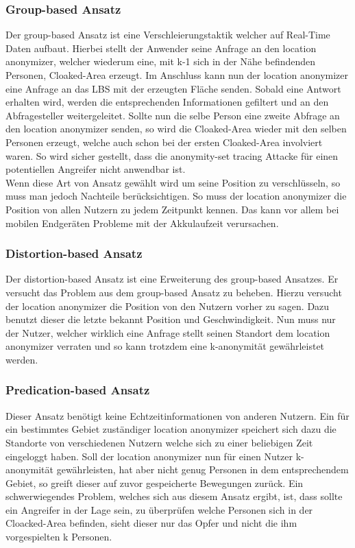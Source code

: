 \subsubsection{Group-based Ansatz}
Der group-based Ansatz ist eine Verschleierungstaktik welcher auf Real-Time Daten aufbaut. Hierbei stellt der Anwender seine Anfrage an den location anonymizer, welcher wiederum eine, mit k-1 sich in der Nähe befindenden Personen, Cloaked-Area erzeugt. Im Anschluss kann nun der location anonymizer eine Anfrage an das LBS mit der erzeugten Fläche senden. Sobald eine Antwort erhalten wird, werden die entsprechenden Informationen gefiltert und an den Abfragesteller weitergeleitet. Sollte nun die selbe Person eine zweite Abfrage an den location anonymizer senden, so wird die Cloaked-Area wieder mit den selben Personen erzeugt, welche auch schon bei der ersten Cloaked-Area involviert waren. So wird sicher gestellt, dass die anonymity-set tracing Attacke für einen potentiellen Angreifer nicht anwendbar ist.\\Wenn diese Art von Ansatz gewählt wird um seine Position zu verschlüsseln, so muss man jedoch Nachteile berücksichtigen. So muss der location anonymizer die Position von allen Nutzern zu jedem Zeitpunkt kennen. Das kann vor allem bei mobilen Endgeräten Probleme mit der Akkulaufzeit verursachen. 
\subsubsection{Distortion-based Ansatz}
Der distortion-based Ansatz ist eine Erweiterung des group-based Ansatzes. Er versucht das Problem aus dem group-based Ansatz zu beheben. Hierzu versucht der location anonymizer die Position von den Nutzern vorher zu sagen. Dazu benutzt dieser die letzte bekannt Position und Geschwindigkeit. Nun muss nur der Nutzer, welcher wirklich eine Anfrage stellt seinen Standort dem location anonymizer verraten und so kann trotzdem eine k-anonymität gewährleistet werden. 
\subsubsection{Predication-based Ansatz}
Dieser Ansatz benötigt keine Echtzeitinformationen von anderen Nutzern. Ein für ein bestimmtes Gebiet zuständiger location anonymizer speichert sich dazu die Standorte von verschiedenen Nutzern welche sich zu einer beliebigen Zeit eingeloggt haben. Soll der location anonymizer nun für einen Nutzer k-anonymität gewährleisten, hat aber nicht genug Personen in dem entsprechendem Gebiet, so greift dieser auf zuvor gespeicherte Bewegungen zurück. Ein schwerwiegendes Problem, welches sich aus diesem Ansatz ergibt, ist, dass sollte ein Angreifer in der Lage sein, zu überprüfen welche Personen sich in der Cloacked-Area befinden, sieht dieser nur das Opfer und nicht die ihm vorgespielten k Personen. 
